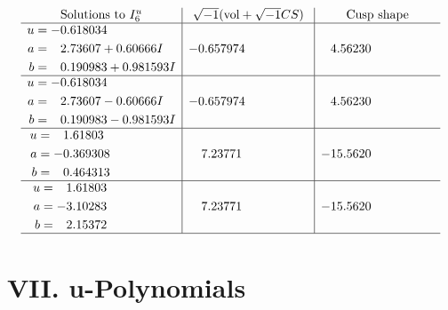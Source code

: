 \documentclass[1p]{elsarticle_modified}
\theoremstyle{definition}
\newcommand{\I}{\sqrt{-1}}
\begin{document}
$$\begin{array}{c|c|c}  
\text{Solutions to }I^u_{6}& \I (\text{vol} + \sqrt{-1}CS) & \text{Cusp shape}\\
 \hline 
\begin{aligned}
u &= -0.618034\phantom{ +0.000000I} \\
a &= \phantom{-}2.73607 + 0.60666 I \\
b &= \phantom{-}0.190983 + 0.981593 I\end{aligned}
 & -0.657974\phantom{ +0.000000I} & \phantom{-}4.56230\phantom{ +0.000000I} \\ \hline\begin{aligned}
u &= -0.618034\phantom{ +0.000000I} \\
a &= \phantom{-}2.73607 - 0.60666 I \\
b &= \phantom{-}0.190983 - 0.981593 I\end{aligned}
 & -0.657974\phantom{ +0.000000I} & \phantom{-}4.56230\phantom{ +0.000000I} \\ \hline\begin{aligned}
u &= \phantom{-}1.61803\phantom{ +0.000000I} \\
a &= -0.369308\phantom{ +0.000000I} \\
b &= \phantom{-}0.464313\phantom{ +0.000000I}\end{aligned}
 & \phantom{-}7.23771\phantom{ +0.000000I} & -15.5620\phantom{ +0.000000I} \\ \hline\begin{aligned}
u &= \phantom{-}1.61803\phantom{ +0.000000I} \\
a &= -3.10283\phantom{ +0.000000I} \\
b &= \phantom{-}2.15372\phantom{ +0.000000I}\end{aligned}
 & \phantom{-}7.23771\phantom{ +0.000000I} & -15.5620\phantom{ +0.000000I}\\
 \hline 
 \end{array}$$\newpage
\newpage\renewcommand{\arraystretch}{1}
\centering \section*{ VII. u-Polynomials}
\end{document}
